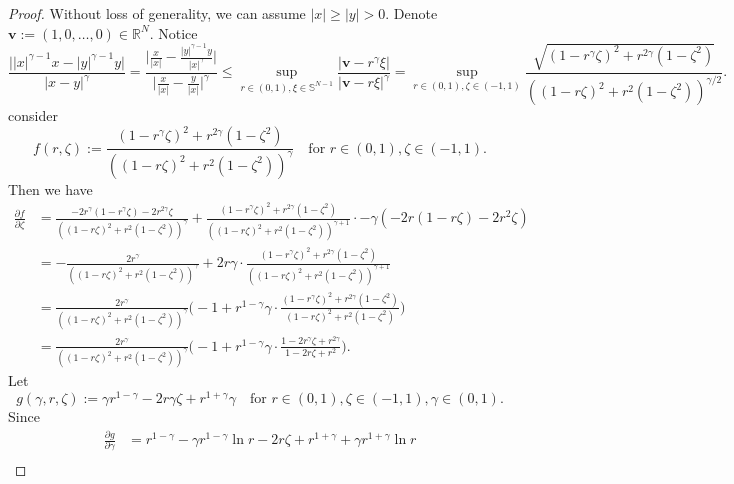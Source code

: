\begin{proof}
  Without loss of generality, we can assume $|x|\ge |y| > 0$. 
  Denote $\mathbf{v} := (1,0,\dots,0)\in\mathbb{R}^N$.
  Notice 
  \begin{equation*}
    \frac{\Big||x|^{\gamma-1}x - |y|^{\gamma-1}y\Big|}{|x-y|^{\gamma}}
    = \frac{\bigg|\frac{x}{|x|} -\frac{|y|^{\gamma-1}y}{|x|^\gamma}\bigg|}{\bigg|\frac{x}{|x|}-\frac{y}{|x|}\bigg|^\gamma} 
    \leq \sup_{r\in(0,1),\xi\in\mathbb{S}^{N-1}}\frac{|\mathbf{v}-r^\gamma \xi|}{|\mathbf{v}-r\xi|^\gamma}
    = \sup_{r\in(0,1),\zeta\in(-1,1)}\frac{\sqrt{(1-r^\gamma\zeta)^2+r^{2\gamma}(1-\zeta^2)}}{((1-r\zeta)^2 + r^2(1-\zeta^2))^{\gamma/2}}.
  \end{equation*}
  consider 
  \begin{equation*}
  f(r,\zeta) := \frac{(1-r^\gamma\zeta)^2+r^{2\gamma}(1-\zeta^2)}{((1-r\zeta)^2 + r^2(1-\zeta^2))^{\gamma}}
  \quad \text{for } r\in(0,1),\zeta\in(-1,1).
  \end{equation*}
  Then we have
  \begin{align*}
    \frac{\partial f}{\partial \zeta} 
    &= \frac{-2r^\gamma(1-r^\gamma\zeta)-2r^{2\gamma}\zeta}{((1-r\zeta)^2 + r^2(1-\zeta^2))^{\gamma}} 
    + \frac{(1-r^\gamma\zeta)^2+r^{2\gamma}(1-\zeta^2)}{((1-r\zeta)^2 + r^2(1-\zeta^2))^{\gamma+1}}\cdot - \gamma(-2r(1-r\zeta)-2r^2\zeta)\\
    &= - \frac{2r^\gamma}{((1-r\zeta)^2 + r^2(1-\zeta^2))^{\gamma}} 
    + 2r\gamma\cdot\frac{(1-r^\gamma\zeta)^2+r^{2\gamma}(1-\zeta^2)}{((1-r\zeta)^2 + r^2(1-\zeta^2))^{\gamma+1}}\\
    &= \frac{2r^\gamma}{((1-r\zeta)^2 + r^2(1-\zeta^2))^{\gamma}} 
    \bigg(-1 + r^{1-\gamma}\gamma\cdot\frac{(1-r^\gamma\zeta)^2+r^{2\gamma}(1-\zeta^2)}{(1-r\zeta)^2 + r^2(1-\zeta^2)}\bigg)\\
    &= \frac{2r^\gamma}{((1-r\zeta)^2 + r^2(1-\zeta^2))^{\gamma}} 
    \bigg(-1 + r^{1-\gamma}\gamma\cdot\frac{1-2r^\gamma\zeta + r^{2\gamma}}{1-2r\zeta + r^2}\bigg).
  \end{align*}
  Let 
  \begin{equation*}
    g(\gamma, r,\zeta) := \gamma r^{1-\gamma}
    - 2r\gamma\zeta + r^{1+\gamma}\gamma 
    \quad \text{for } r\in(0,1),\zeta\in(-1,1), \gamma\in(0,1).
  \end{equation*}
  Since 
  \begin{align*}
    \frac{\partial g}{\partial \gamma} 
    &= r^{1-\gamma} 
    - \gamma r^{1-\gamma}\ln r 
    - 2r\zeta 
    + r^{1+\gamma} 
    + \gamma r^{1+\gamma} \ln r \\

\end{align*}
\end{proof}
